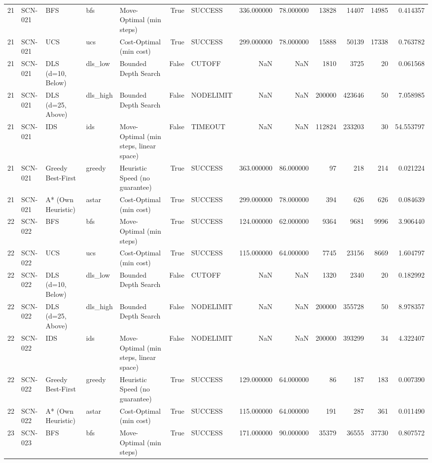 \begin{table}[htbp]
\begin{tabular}{rllllrlrrrrrr}
21 & SCN-021 & BFS & bfs & Move-Optimal (min steps) & True & SUCCESS & 336.000000 & 78.000000 & 13828 & 14407 & 14985 & 0.414357 \\
21 & SCN-021 & UCS & ucs & Cost-Optimal (min cost) & True & SUCCESS & 299.000000 & 78.000000 & 15888 & 50139 & 17338 & 0.763782 \\
21 & SCN-021 & DLS (d=10, Below) & dls\_low & Bounded Depth Search & False & CUTOFF & NaN & NaN & 1810 & 3725 & 20 & 0.061568 \\
21 & SCN-021 & DLS (d=25, Above) & dls\_high & Bounded Depth Search & False & NODELIMIT & NaN & NaN & 200000 & 423646 & 50 & 7.058985 \\
21 & SCN-021 & IDS & ids & Move-Optimal (min steps, linear space) & False & TIMEOUT & NaN & NaN & 112824 & 233203 & 30 & 54.553797 \\
21 & SCN-021 & Greedy Best-First & greedy & Heuristic Speed (no guarantee) & True & SUCCESS & 363.000000 & 86.000000 & 97 & 218 & 214 & 0.021224 \\
21 & SCN-021 & A* (Own Heuristic) & astar & Cost-Optimal (min cost) & True & SUCCESS & 299.000000 & 78.000000 & 394 & 626 & 626 & 0.084639 \\
22 & SCN-022 & BFS & bfs & Move-Optimal (min steps) & True & SUCCESS & 124.000000 & 62.000000 & 9364 & 9681 & 9996 & 3.906440 \\
22 & SCN-022 & UCS & ucs & Cost-Optimal (min cost) & True & SUCCESS & 115.000000 & 64.000000 & 7745 & 23156 & 8669 & 1.604797 \\
22 & SCN-022 & DLS (d=10, Below) & dls\_low & Bounded Depth Search & False & CUTOFF & NaN & NaN & 1320 & 2340 & 20 & 0.182992 \\
22 & SCN-022 & DLS (d=25, Above) & dls\_high & Bounded Depth Search & False & NODELIMIT & NaN & NaN & 200000 & 355728 & 50 & 8.978357 \\
22 & SCN-022 & IDS & ids & Move-Optimal (min steps, linear space) & False & NODELIMIT & NaN & NaN & 200000 & 393299 & 34 & 4.322407 \\
22 & SCN-022 & Greedy Best-First & greedy & Heuristic Speed (no guarantee) & True & SUCCESS & 129.000000 & 64.000000 & 86 & 187 & 183 & 0.007390 \\
22 & SCN-022 & A* (Own Heuristic) & astar & Cost-Optimal (min cost) & True & SUCCESS & 115.000000 & 64.000000 & 191 & 287 & 361 & 0.011490 \\
23 & SCN-023 & BFS & bfs & Move-Optimal (min steps) & True & SUCCESS & 171.000000 & 90.000000 & 35379 & 36555 & 37730 & 0.807572 \\

\end{tabular}
\end{table}
